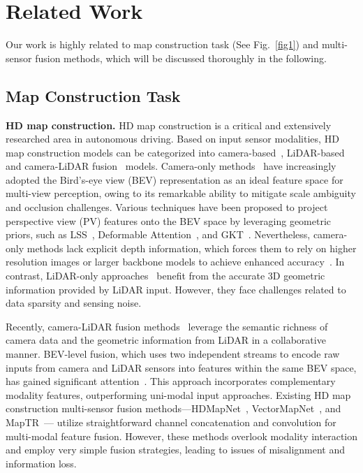 \section{Related Work}
\label{sec2}
Our work is highly related to map construction task (See  Fig.~\ref{fig1}) and multi-sensor fusion methods, which will be discussed thoroughly in the following.


\subsection{Map Construction Task}
\textbf{HD map construction.}
HD map construction is a critical and extensively researched area in autonomous driving.
Based on input sensor modalities,
HD map construction models can be categorized into camera-based~\cite{zhang2023online,ding2023pivotnet,qiao2023end,maptrv2,yuan2024streammapnet}, LiDAR-based~\cite{lang2019pointpillars,yin2021center} and camera-LiDAR fusion~\cite{li2022hdmapnet,liu2023vectormapnet,MapTR,hao2025msc,hao2024your} models.
Camera-only methods~\cite{zhang2023online,ding2023pivotnet,qiao2023end,maptrv2,yuan2024streammapnet} have increasingly adopted the Bird's-eye view (BEV) representation as an ideal feature space for multi-view perception, owing to its remarkable ability to mitigate scale ambiguity and occlusion challenges. 
Various techniques have been proposed to project perspective view (PV) features onto the BEV space by leveraging geometric priors, such as LSS~\cite{philion2020lift}, Deformable Attention~\cite{22eccvbevformer}, and GKT~\cite{2022GKT}.
Nevertheless, camera-only methods lack explicit depth information, which forces them to rely on higher resolution images or larger backbone models to achieve enhanced accuracy~\cite{liu2021Swin,liu2021swinv2,hao2023mixgen,wang2022internimage,22eccvbevformer,yang2022bevformer,xiong2023neural}. 
In contrast, LiDAR-only approaches~\cite{lang2019pointpillars,yin2021center} benefit from the accurate 3D geometric information provided by LiDAR input.
However, they face challenges related to data sparsity and sensing noise.






Recently, camera-LiDAR fusion methods~\cite{li2022hdmapnet,liu2023vectormapnet,MapTR} leverage the semantic richness of camera data and the geometric information from LiDAR in a collaborative manner. 
BEV-level fusion, which uses two independent streams to encode raw inputs from camera and LiDAR sensors into features within the same BEV space, has gained significant attention~\cite{liu2023bevfusion,bevfusion22mips}.
This approach incorporates complementary modality features, outperforming uni-modal input approaches.
Existing HD map construction multi-sensor fusion methods—HDMapNet~\cite{li2022hdmapnet}, VectorMapNet~\cite{liu2023vectormapnet}, and MapTR~\cite{MapTR}— utilize straightforward channel concatenation and convolution for multi-modal feature fusion. 
However, these methods overlook modality interaction and employ very simple fusion strategies, leading to issues of misalignment and information loss.




